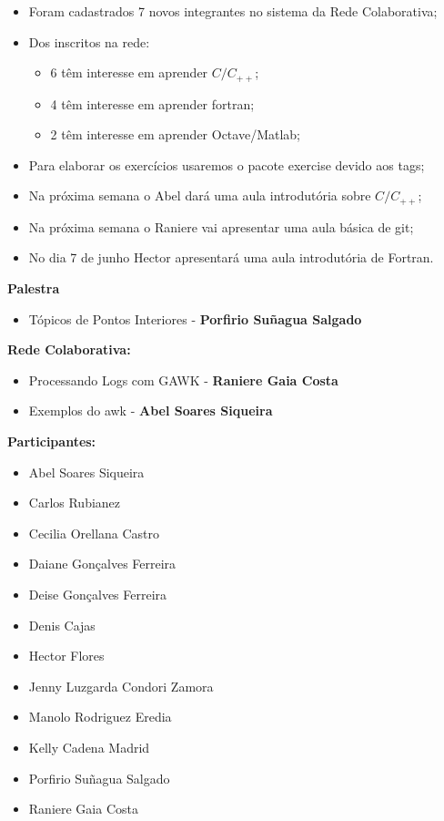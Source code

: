 \documentclass[12pt]{article}
\begin{document}
\begin{itemize}
\item Foram cadastrados 7 novos integrantes no sistema da Rede Colaborativa;
\item Dos inscritos na rede:
\begin{itemize}
\item 6 t\^em interesse em aprender $C/C_{++}$;
\item 4 t\^em interesse em aprender fortran;
\item 2 t\^em interesse em aprender Octave/Matlab;
\end{itemize}
\item Para elaborar os exerc\'icios usaremos o pacote exercise devido aos tags;
\item Na pr\'oxima semana o Abel dar\'a uma aula introdut\'oria sobre $C/C_{++}$;
\item Na pr\'oxima semana o Raniere vai apresentar uma aula b\'asica de git;
\item No dia 7 de junho Hector apresentar\'a uma aula introdut\'oria de Fortran.
\end{itemize}

{\bf Palestra}

\begin{itemize}
\item T\'opicos de Pontos Interiores - {\bf Porfirio Su\~nagua Salgado}
\end{itemize}

{\bf Rede Colaborativa:}

\begin{itemize}
\item Processando Logs com GAWK - {\bf Raniere Gaia Costa}
\item Exemplos do awk - {\bf Abel Soares Siqueira}
\end{itemize}

{\bf{Participantes:}}

\begin{itemize}
\item Abel Soares Siqueira
\item Carlos Rubianez
\item Cecilia Orellana Castro
\item Daiane Gon\c{c}alves Ferreira
\item Deise Gon\c{c}alves Ferreira
\item Denis Cajas
\item Hector Flores
\item Jenny Luzgarda Condori Zamora
\item Manolo Rodriguez Eredia
\item Kelly Cadena Madrid
\item Porfirio Su\~nagua Salgado
\item Raniere Gaia Costa
\end{itemize}
\end{document}
